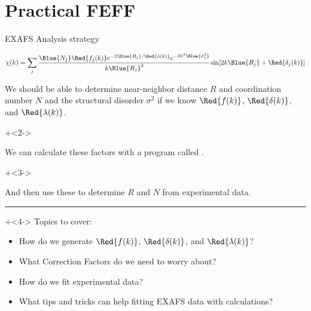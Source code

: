 \section{Practical FEFF}

\begin{slide}{EXAFS Analysis strategy}

  \begin{center}
    \[ \chi(k) = \sum_j {\frac{{\Blue{N_j}} {\Red{f_j(k)}}
        e^{-2{\Blue{R_j}}/{\Red{\lambda(k)}}}
        e^{-2k^2{\Blue{\sigma_j^2}}}}{k{\Blue{R_j}}^2}
      {\sin[{2k{\Blue{R_j}} + {\Red{\delta_j(k)}}] }}} \]
  \end{center}

  We should be able to determine near-neighbor distance $R$ and
  coordination number $N$ and the structural disorder $\sigma^2$ if we know
  $\Red{f(k)}$, $\Red{\delta(k)}$, and $\Red{\lambda(k)}$.

  \onslide+<2->\vmm

  We can calculate these factors with a program called {\feff}.

  \onslide+<3->\vmm

  And then use these to determine $R$ and $N$ from experimental data.

   \vmm \hrule \vmm
   \onslide+<4->
  Topics to cover:
  \begin{itemize}
  \item How do we generate $\Red{f(k)}$, $\Red{\delta(k)}$,  and
    $\Red{\lambda(k)}$?
  \item What Correction Factors do we need to worry about?
  \item How do we fit experimental data?
  \item What tips and tricks can help fitting EXAFS data with {\feff}
    calculations?
  \end{itemize}

\end{slide}

